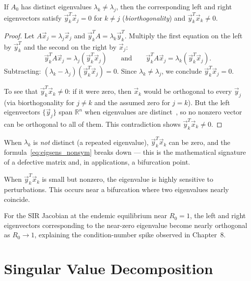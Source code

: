 \begin{proposition}
\label{prop:biorthogonality}
If $A_0$ has distinct eigenvalues $\lambda_k \neq \lambda_j$, then
the corresponding left and right eigenvectors satisfy
$\vec{y}_k^T\vec{x}_j = 0$ for $k \neq j$
(\emph{biorthogonality}) and $\vec{y}_k^T\vec{x}_k \neq 0$.
\end{proposition}

\begin{proof}
Let $A\vec{x}_j = \lambda_j\vec{x}_j$ and $\vec{y}_k^T A = \lambda_k\vec{y}_k^T$.
Multiply the first equation on the left by $\vec{y}_k^T$ and the
second on the right by $\vec{x}_j$:
\[
  \vec{y}_k^T A \vec{x}_j = \lambda_j(\vec{y}_k^T\vec{x}_j)
  \qquad\text{and}\qquad
  \vec{y}_k^T A \vec{x}_j = \lambda_k(\vec{y}_k^T\vec{x}_j).
\]
Subtracting: $(\lambda_k - \lambda_j)(\vec{y}_k^T\vec{x}_j) = 0$.
Since $\lambda_k \neq \lambda_j$, we conclude $\vec{y}_k^T\vec{x}_j = 0$.

To see that $\vec{y}_k^T\vec{x}_k \neq 0$: if it were zero, then
$\vec{x}_k$ would be orthogonal to every $\vec{y}_j$ (via biorthogonality
for $j \neq k$ and the assumed zero for $j = k$). But the left
eigenvectors $\{\vec{y}_j\}$ span $\mathbb{R}^n$ when eigenvalues are
distinct~\cite[Theorem~1.4.5]{horn2012matrix}, so no nonzero vector
can be orthogonal to all of them. This contradiction shows
$\vec{y}_k^T\vec{x}_k \neq 0$.
\end{proof}

When $\lambda_k$ is \emph{not} distinct (a repeated eigenvalue),
$\vec{y}_k^T\vec{x}_k$ can be zero, and the formula~\eqref{eq:eigsens_nonsym}
breaks down — this is the mathematical signature of a defective matrix
and, in applications, a bifurcation point.

When $\vec{y}_k^T\vec{x}_k$ is small but nonzero, the eigenvalue is highly
sensitive to perturbations. This occurs near a bifurcation where
two eigenvalues nearly coincide.

For the SIR Jacobian at the endemic equilibrium near $R_0 = 1$,
the left and right eigenvectors corresponding to the near-zero
eigenvalue become nearly orthogonal as $R_0 \to 1$, explaining
the condition-number spike observed in Chapter~8.

\section{Singular Value Decomposition}
\label{appsec:SVD}

